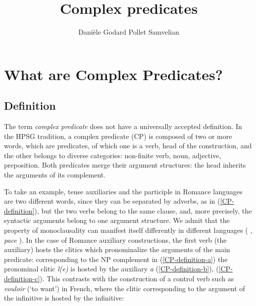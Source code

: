 \documentclass[output=paper]{langsci/langscibook}
\author{%
	Danièle Godard\affiliation{Université Paris Diderot}%
	\lastand Pollet Samvelian\affiliation{Université Sorbonne Nouvelle}
}
\title{Complex predicates}
\begin{document}
\label{chap-complex-predicates}


\section{What are Complex Predicates?} 

\subsection{Definition}


The term \textit{complex predicate} does not have a universally accepted definition. In the HPSG tradition, a complex predicate (CP) is composed of two or more words, which are predicates, of which one is a verb, head of the construction, and the other belongs to diverse categories:  non-finite verb, noun, adjective, preposition. Both predicates merge their argument structures: the head inherits the arguments of its complement.

To take an example, tense auxiliaries and the participle in Romance languages are two different words, since they can be separated by adverbs, as in (\ref{CP-definition}), but the two verbs belong to the same clause, and, more precisely, the syntactic arguments belong to one argument structure. We admit that the property of monoclausality can manifest itself differently in different languages (\cite{Butt2010a} , \textit{pace} \cite{MH2016}). In the case of Romance auxiliary constructions, the first verb (the auxiliary) hosts the clitics which pronominalize the arguments of the main predicate: corresponding to the NP complement in  (\ref{CP-definition-a})  the pronominal clitic \textit{l(e)} is hosted by the auxiliary \textit{a} (\ref{CP-definition-b}),  (\ref{CP-definition-c}). This contrasts with the construction of a control verb such as \textit{vouloir} (`to want') in French, where the clitic corresponding to the argument of the infinitive is hosted by the infinitive: 




\begin{exe}
	\ex \label{CP-definition} 
	\begin{xlist}
		 \label{CP-definition-a} 
		
		  \label{CP-definition-b}  
		
		 \label{CP-definition-c} 
	\end{xlist}
\end{exe}
\end{document}
